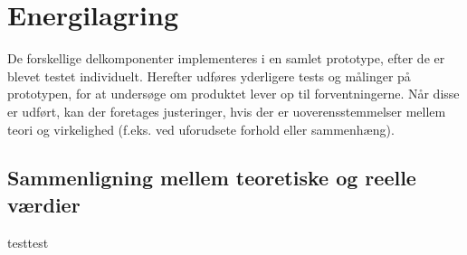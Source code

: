 \documentclass[../main.tex]{subfiles}
\begin{document}
\chapter{Energilagring } \label{Chap:Energilagring}
De forskellige delkomponenter implementeres i en samlet prototype, efter de er blevet testet individuelt. Herefter udføres yderligere tests og målinger på prototypen, for at undersøge om produktet lever op til forventningerne. Når disse er udført, kan der foretages justeringer, hvis der er uoverensstemmelser mellem teori og virkelighed (f.eks. ved uforudsete forhold eller sammenhæng).

\section{Sammenligning mellem teoretiske og reelle værdier}
testtest
\end{document}
